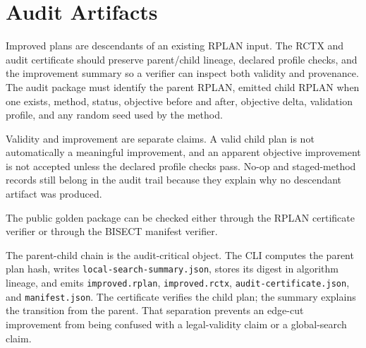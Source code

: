 \section{Audit Artifacts}

Improved plans are descendants of an existing RPLAN input. The RCTX and audit
certificate should preserve parent/child lineage, declared profile checks, and
the improvement summary so a verifier can inspect both validity and provenance.
The audit package must identify the parent RPLAN, emitted child RPLAN when one
exists, method, status, objective before and after, objective delta, validation
profile, and any random seed used by the method.

Validity and improvement are separate claims. A valid child plan is not
automatically a meaningful improvement, and an apparent objective improvement is
not accepted unless the declared profile checks pass. No-op and staged-method
records still belong in the audit trail because they explain why no descendant
artifact was produced.

The public golden package can be checked either through the RPLAN certificate
verifier or through the BISECT manifest verifier.

The parent-child chain is the audit-critical object. The CLI computes the
parent plan hash, writes \texttt{local-search-summary.json}, stores its digest
in algorithm lineage, and emits \texttt{improved.rplan}, \texttt{improved.rctx},
\texttt{audit-certificate.json}, and \texttt{manifest.json}. The certificate
verifies the child plan; the summary explains the transition from the parent.
That separation prevents an edge-cut improvement from being confused with a
legal-validity claim or a global-search claim.
